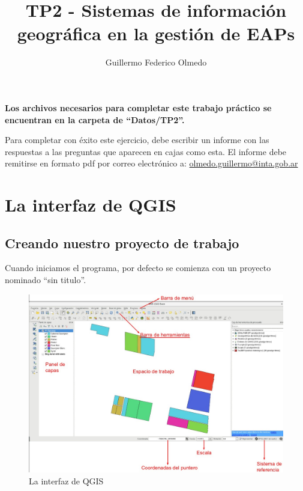 \documentclass[onecolumn]{article}
\title{TP2 - Sistemas de información geográfica en la gestión de EAPs}
\author{Guillermo Federico Olmedo}
\begin{document}

\maketitle

\tableofcontents
\bigskip

\textbf{Los archivos necesarios para completar este trabajo práctico se encuentran en la carpeta de “Datos/TP2”. }\\

\begin{mdframed}
	Para completar con éxito este ejercicio, debe escribir un informe con las respuestas a las preguntas que aparecen en cajas como esta. El informe debe remitirse en formato pdf por correo electrónico a: \url{olmedo.guillermo@inta.gob.ar}
\end{mdframed}


\section{La interfaz de QGIS}

\subsection{Creando nuestro proyecto de trabajo}

Cuando iniciamos el programa, por defecto se comienza con un proyecto nominado “sin titulo”.

\begin{figure}
\centering
\includegraphics[width=1\linewidth]{IMGs/interfaz}
\caption{La interfaz de QGIS}
\label{fig:interfaz}
\end{figure}
\end{document}
